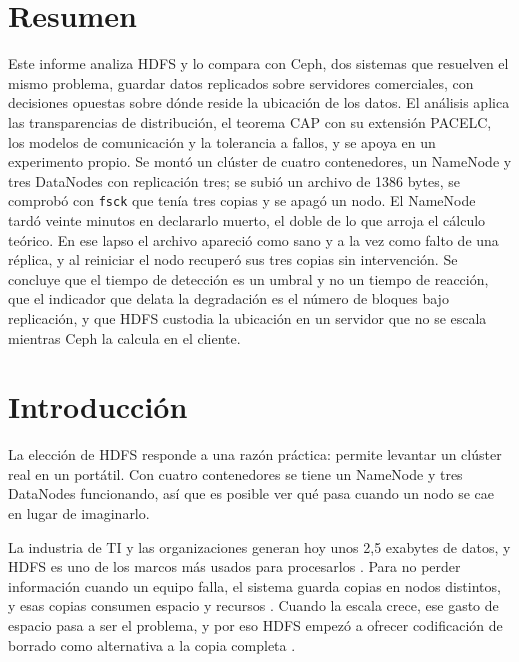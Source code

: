 \documentclass[12pt,a4paper]{article}
\begin{document}
\section*{Resumen}

Este informe analiza HDFS y lo compara con Ceph, dos sistemas que resuelven el mismo problema, guardar datos replicados sobre servidores comerciales, con decisiones opuestas sobre dónde reside la ubicación de los datos. El análisis aplica las transparencias de distribución, el teorema CAP con su extensión PACELC, los modelos de comunicación y la tolerancia a fallos, y se apoya en un experimento propio. Se montó un clúster de cuatro contenedores, un NameNode y tres DataNodes con replicación tres; se subió un archivo de 1386 bytes, se comprobó con \texttt{fsck} que tenía tres copias y se apagó un nodo. El NameNode tardó veinte minutos en declararlo muerto, el doble de lo que arroja el cálculo teórico. En ese lapso el archivo apareció como sano y a la vez como falto de una réplica, y al reiniciar el nodo recuperó sus tres copias sin intervención. Se concluye que el tiempo de detección es un umbral y no un tiempo de reacción, que el indicador que delata la degradación es el número de bloques bajo replicación, y que HDFS custodia la ubicación en un servidor que no se escala mientras Ceph la calcula en el cliente.

\newpage

\section{Introducción}

La elección de HDFS responde a una razón práctica: permite levantar un clúster real en un portátil. Con cuatro contenedores se tiene un NameNode y tres DataNodes funcionando, así que es posible ver qué pasa cuando un nodo se cae en lugar de imaginarlo.

La industria de TI y las organizaciones generan hoy unos 2,5 exabytes de datos, y HDFS es uno de los marcos más usados para procesarlos \cite[p.~2830]{dhulavvagol2023performance}. Para no perder información cuando un equipo falla, el sistema guarda copias en nodos distintos, y esas copias consumen espacio y recursos \cite[p.~18551]{ahmed2023replication}. Cuando la escala crece, ese gasto de espacio pasa a ser el problema, y por eso HDFS empezó a ofrecer codificación de borrado como alternativa a la copia completa \cite[p.~3]{kim2021erasure}.
\end{document}
